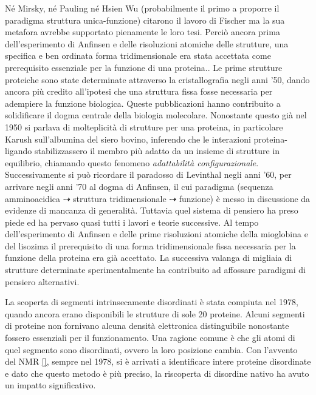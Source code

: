 {Né Mirsky, né Pauling né Hsien Wu (probabilmente il primo a proporre il paradigma struttura unica-funzione) citarono il lavoro di Fischer ma la sua metafora avrebbe supportato pienamente le loro tesi. Perciò ancora prima dell'esperimento di Anfinsen e delle risoluzioni atomiche delle strutture, una specifica e ben ordinata forma tridimensionale era stata accettata come prerequisito essenziale per la funzione di una proteina.\supercite{dunker2001intrinsically}. Le prime strutture proteiche sono state determinate attraverso la cristallografia negli anni '50, dando ancora più credito all'ipotesi che una struttura fissa fosse necessaria per adempiere la funzione biologica. Queste pubblicazioni hanno contribuito a solidificare il dogma centrale della biologia molecolare. Nonostante questo già nel 1950 si parlava di molteplicità di strutture per una proteina, in particolare Karush\supercite{karush1950heterogeneity} sull'albumina del siero bovino, inferendo che le interazioni proteina-ligando stabilizzassero il membro più adatto da un insieme di strutture in equilibrio, chiamando questo fenomeno \textit{adattabilità configurazionale}. Successivamente si può ricordare il paradosso di Levinthal negli anni '60, per arrivare negli anni '70 al dogma di Anfinsen, il cui paradigma (sequenza amminoacidica $\dashrightarrow$ struttura tridimensionale $\dashrightarrow$ funzione) è messo in discussione da evidenze di mancanza di generalità. Tuttavia quel sistema di pensiero ha preso piede ed ha pervaso quasi tutti i lavori e teorie successive. Al tempo dell'esperimento di Anfinsen e delle prime risoluzioni atomiche della mioglobina e del lisozima il prerequisito di una forma tridimensionale fissa necessaria per la funzione della proteina era già accettato. La successiva valanga di migliaia di strutture determinate sperimentalmente ha contribuito ad affossare paradigmi di pensiero alternativi.

\par La scoperta di segmenti intrinsecamente disordinati è stata compiuta nel 1978, quando ancora erano disponibili le strutture di sole 20 proteine. Alcuni segmenti di proteine non fornivano alcuna densità elettronica distinguibile nonostante fossero essenziali per il funzionamento. Una  ragione comune è che gli atomi di quel segmento sono disordinati, ovvero la loro posizione cambia. Con l'avvento del NMR \ref{}, sempre nel 1978, si è arrivati a identificare intere proteine disordinate e dato che questo metodo è più preciso, la riscoperta di disordine nativo ha avuto un impatto significativo.

}
